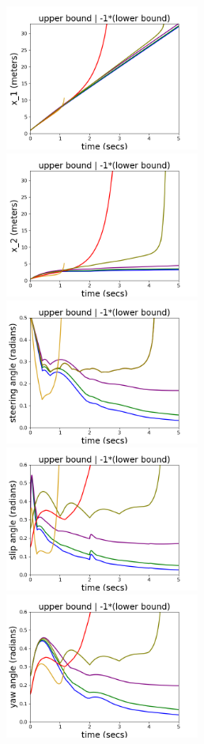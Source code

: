 \begin{figure}
\includegraphics[width=6.4cm,height=4.8cm]{autocarImages/ubToolx1.png}%
\includegraphics[width=6.4cm,height=4.8cm]{autocarImages/ubToolx2.png}
\includegraphics[width=6.4cm,height=4.8cm]{autocarImages/ubToolSteering.png}%
\includegraphics[width=6.4cm,height=4.8cm]{autocarImages/ubToolSlip.png}
\includegraphics[width=6.4cm,height=4.8cm]{autocarImages/ubToolYaw.png}%

\end{figure}
